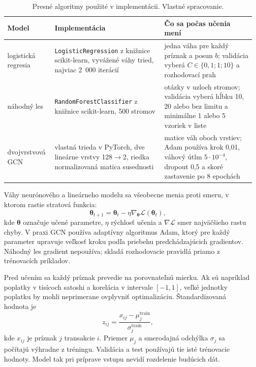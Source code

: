 \begin{table}[htbp]
  \centering
  \small
  \caption{Presné algoritmy použité v implementácii. Vlastné spracovanie.}
  \label{tab:implemented-models}
  \begin{tabularx}{\textwidth}{lXX}
    \toprule
    Model & Implementácia & Čo sa počas učenia mení \\
    \midrule
    logistická regresia &
      \texttt{LogisticRegression} z knižnice scikit-learn,
      vyvážené váhy tried, najviac 2~000 iterácií &
      jedna váha pre každý príznak a posun $b$; validácia vyberá
      $C\in\{0{,}1;1;10\}$ a rozhodovací prah \\
    náhodný les &
      \texttt{RandomForestClassifier} z knižnice scikit-learn,
      500 stromov &
      otázky v uzloch stromov; validácia vyberá hĺbku 10, 20 alebo bez
      limitu a minimálne 1 alebo 5 vzoriek v liste \\
    dvojvrstvová GCN &
      vlastná trieda v PyTorch, dve lineárne vrstvy 128$\rightarrow$2,
      riedka normalizovaná matica susednosti &
      matice váh oboch vrstiev; Adam používa krok 0,01, váhový útlm
      $5\cdot10^{-4}$, dropout 0,5 a skoré zastavenie po 8 epochách \\
    \bottomrule
  \end{tabularx}
\end{table}

Váhy neurónového a lineárneho modelu sa všeobecne menia proti smeru,
v ktorom rastie stratová funkcia:
\begin{equation}
  \boldsymbol{\theta}_{t+1}
  =\boldsymbol{\theta}_{t}-\eta\nabla_{\boldsymbol{\theta}}
  \mathcal{L}(\boldsymbol{\theta}_{t}),
  \label{eq:gradient-update}
\end{equation}
kde $\boldsymbol{\theta}$ označuje učené parametre, $\eta$ rýchlosť
učenia a $\nabla\mathcal{L}$ smer najväčšieho rastu chyby. V praxi GCN
používa adaptívny algoritmus Adam, ktorý pre každý parameter upravuje
veľkosť kroku podľa priebehu predchádzajúcich gradientov. Náhodný les
gradient nepoužíva; skladá rozhodovacie pravidlá priamo z trénovacích
príkladov.

Pred učením sa každý príznak prevedie na porovnateľnú mierku. Ak sú
napríklad poplatky v tisícoch satoshi a korelácia v intervale
$[-1,1]$, veľké jednotky poplatku by mohli neprimerane ovplyvniť
optimalizáciu. Štandardizovaná hodnota je
\begin{equation}
  z_{ij}=\frac{x_{ij}-\mu_j^{\mathrm{train}}}
  {\sigma_j^{\mathrm{train}}},
  \label{eq:training-standardization}
\end{equation}
kde $x_{ij}$ je príznak $j$ transakcie $i$. Priemer $\mu_j$ a
smerodajná odchýlka $\sigma_j$ sa počítajú výhradne z tréningu.
Validácia a test používajú tie isté trénovacie hodnoty. Model tak pri
príprave vstupu nevidí rozdelenie budúcich dát.


